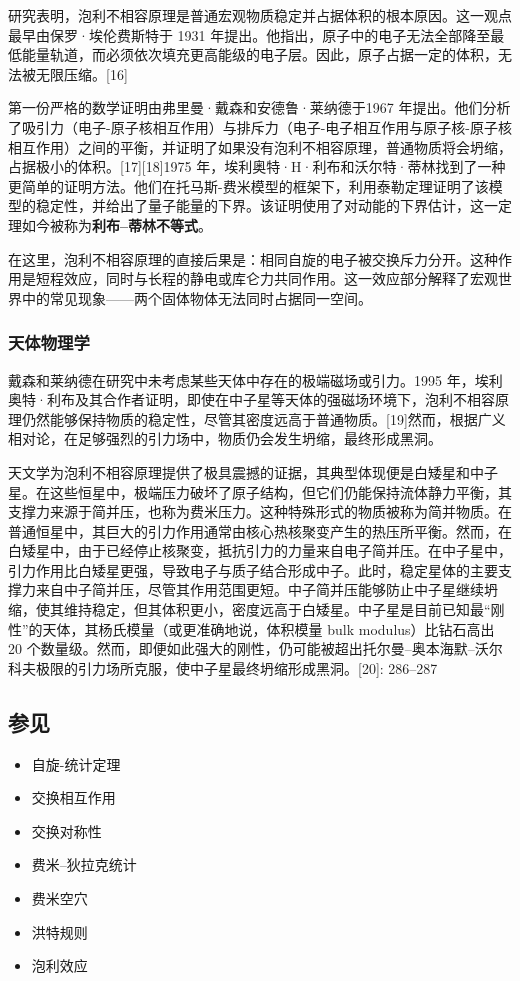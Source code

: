 研究表明，泡利不相容原理是普通宏观物质稳定并占据体积的根本原因。这一观点最早由保罗·埃伦费斯特于 1931 年提出。他指出，原子中的电子无法全部降至最低能量轨道，而必须依次填充更高能级的电子层。因此，原子占据一定的体积，无法被无限压缩。[16]

第一份严格的数学证明由弗里曼·戴森和安德鲁·莱纳德于1967 年提出。他们分析了吸引力（电子-原子核相互作用）与排斥力（电子-电子相互作用与原子核-原子核相互作用）之间的平衡，并证明了如果没有泡利不相容原理，普通物质将会坍缩，占据极小的体积。[17][18]1975 年，埃利奥特·H·利布和沃尔特·蒂林找到了一种更简单的证明方法。他们在托马斯-费米模型的框架下，利用泰勒定理证明了该模型的稳定性，并给出了量子能量的下界。该证明使用了对动能的下界估计，这一定理如今被称为\textbf{利布–蒂林不等式}。

在这里，泡利不相容原理的直接后果是：相同自旋的电子被交换斥力分开。这种作用是短程效应，同时与长程的静电或库仑力共同作用。这一效应部分解释了宏观世界中的常见现象——两个固体物体无法同时占据同一空间。
\subsubsection{天体物理学}  
戴森和莱纳德在研究中未考虑某些天体中存在的极端磁场或引力。1995 年，埃利奥特·利布及其合作者证明，即使在中子星等天体的强磁场环境下，泡利不相容原理仍然能够保持物质的稳定性，尽管其密度远高于普通物质。[19]然而，根据广义相对论，在足够强烈的引力场中，物质仍会发生坍缩，最终形成黑洞。

天文学为泡利不相容原理提供了极具震撼的证据，其典型体现便是白矮星和中子星。在这些恒星中，极端压力破坏了原子结构，但它们仍能保持流体静力平衡，其支撑力来源于简并压，也称为费米压力。这种特殊形式的物质被称为简并物质。在普通恒星中，其巨大的引力作用通常由核心热核聚变产生的热压所平衡。然而，在白矮星中，由于已经停止核聚变，抵抗引力的力量来自电子简并压。在中子星中，引力作用比白矮星更强，导致电子与质子结合形成中子。此时，稳定星体的主要支撑力来自中子简并压，尽管其作用范围更短。中子简并压能够防止中子星继续坍缩，使其维持稳定，但其体积更小，密度远高于白矮星。中子星是目前已知最“刚性”的天体，其杨氏模量（或更准确地说，体积模量 bulk modulus）比钻石高出 20 个数量级。然而，即便如此强大的刚性，仍可能被超出托尔曼–奥本海默–沃尔科夫极限的引力场所克服，使中子星最终坍缩形成黑洞。[20]: 286–287
\subsection{参见} 
\begin{itemize}
\item 自旋-统计定理  
\item 交换相互作用
\item 交换对称性
\item 费米–狄拉克统计 
\item 费米空穴 
\item 洪特规则  
\item 泡利效应
\end{itemize}
